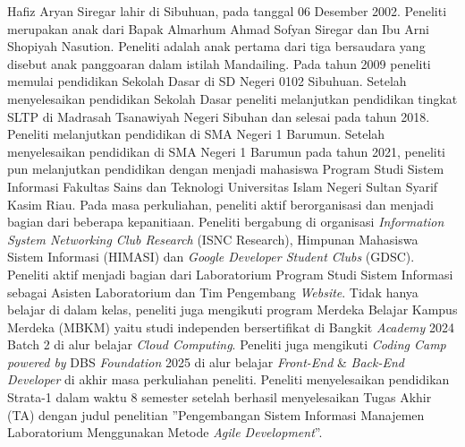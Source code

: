 Hafiz Aryan Siregar lahir di Sibuhuan, pada tanggal 06 Desember 2002. Peneliti merupakan anak dari Bapak Almarhum Ahmad Sofyan Siregar dan Ibu Arni Shopiyah Nasution. Peneliti adalah anak pertama dari tiga bersaudara yang disebut anak panggoaran dalam istilah Mandailing. Pada tahun 2009 peneliti memulai pendidikan Sekolah Dasar di SD Negeri 0102 Sibuhuan. Setelah menyelesaikan pendidikan Sekolah Dasar peneliti melanjutkan pendidikan tingkat SLTP di Madrasah Tsanawiyah Negeri Sibuhan dan selesai pada tahun 2018. Peneliti melanjutkan pendidikan di SMA Negeri 1 Barumun. Setelah menyelesaikan pendidikan di SMA Negeri 1 Barumun pada tahun 2021, peneliti pun melanjutkan pendidikan dengan menjadi mahasiswa Program Studi Sistem Informasi Fakultas Sains dan Teknologi Universitas Islam Negeri Sultan Syarif Kasim Riau. Pada masa perkuliahan, peneliti aktif berorganisasi dan menjadi bagian dari beberapa kepanitiaan. Peneliti bergabung di organisasi \textit{Information System Networking Club Research} (ISNC Research), Himpunan Mahasiswa Sistem Informasi (HIMASI) dan \textit{Google Developer Student Clubs} (GDSC). Peneliti aktif menjadi bagian dari Laboratorium Program Studi Sistem Informasi sebagai Asisten Laboratorium dan Tim Pengembang \textit{Website}. Tidak hanya belajar di dalam kelas, peneliti juga mengikuti program Merdeka Belajar Kampus Merdeka (MBKM) yaitu studi independen bersertifikat di Bangkit \textit{Academy} 2024 Batch 2 di alur belajar \textit{Cloud Computing}. Peneliti juga mengikuti \textit{Coding Camp powered by} DBS \textit{Foundation} 2025 di alur belajar \textit{Front-End} \& \textit{Back-End Developer} di akhir masa perkuliahan peneliti. Peneliti menyelesaikan pendidikan Strata-1 dalam waktu 8 semester setelah berhasil menyelesaikan Tugas Akhir (TA) dengan judul penelitian ”Pengembangan Sistem Informasi Manajemen Laboratorium Menggunakan Metode \textit{Agile Development}”.